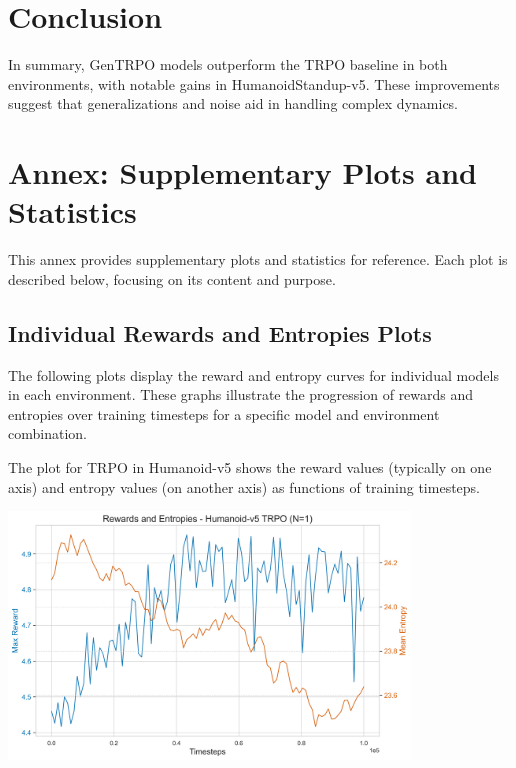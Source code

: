 \documentclass{svproc}
\begin{document}
\section{Conclusion}
In summary, GenTRPO models outperform the TRPO baseline in both environments, with notable gains in HumanoidStandup-v5. These improvements suggest that generalizations and noise aid in handling complex dynamics.




\appendix
\section{Annex: Supplementary Plots and Statistics}

This annex provides supplementary plots and statistics for reference. Each plot is described below, focusing on its content and purpose.

\subsection{Individual Rewards and Entropies Plots}
The following plots display the reward and entropy curves for individual models in each environment. These graphs illustrate the progression of rewards and entropies over training timesteps for a specific model and environment combination.

The plot for TRPO in Humanoid-v5 shows the reward values (typically on one axis) and entropy values (on another axis) as functions of training timesteps.

\begin{center}
\includegraphics[width=0.8\textwidth]{graph_Humanoid-v5_trpo_rewards_entropies.png}
\end{center}
\end{document}
